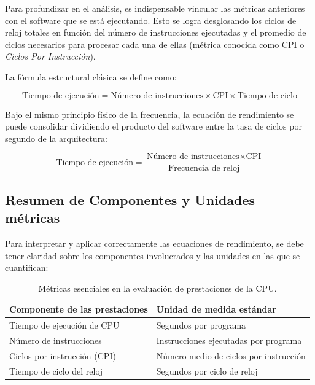 \documentclass[12pt,a4paper]{article}
\begin{document}
	Para profundizar en el análisis, es indispensable vincular las métricas anteriores con el software que se está ejecutando. Esto se logra desglosando los ciclos de reloj totales en función del número de instrucciones ejecutadas y el promedio de ciclos necesarios para procesar cada una de ellas (métrica conocida como CPI o \textit{Ciclos Por Instrucción}).
	
	La fórmula estructural clásica se define como:
	
	\begin{equation}
		\text{Tiempo de ejecución} = \text{Número de instrucciones} \times \text{CPI} \times \text{Tiempo de ciclo}
	\end{equation}
	
	Bajo el mismo principio físico de la frecuencia, la ecuación de rendimiento se puede consolidar dividiendo el producto del software entre la tasa de ciclos por segundo de la arquitectura:
	
	\begin{equation}
		\text{Tiempo de ejecución} = \frac{\text{Número de instrucciones} \times \text{CPI}}{\text{Frecuencia de reloj}}
	\end{equation}
	
	\subsection{Resumen de Componentes y Unidades métricas}
	
	Para interpretar y aplicar correctamente las ecuaciones de rendimiento, se debe tener claridad sobre los componentes involucrados y las unidades en las que se cuantifican:
	
	\begin{table}[htbp]
		\centering
		\caption{Métricas esenciales en la evaluación de prestaciones de la CPU.}
		\vspace{0.3cm}
		\begin{tabular}{ll}
			\toprule
			\textbf{Componente de las prestaciones} & \textbf{Unidad de medida estándar} \\
			\midrule
			Tiempo de ejecución de CPU & Segundos por programa \\
			Número de instrucciones & Instrucciones ejecutadas por programa \\
			Ciclos por instrucción (CPI) & Número medio de ciclos por instrucción \\
			Tiempo de ciclo del reloj & Segundos por ciclo de reloj \\
			\bottomrule
		\end{tabular}
	\end{table}
	
\end{document}

